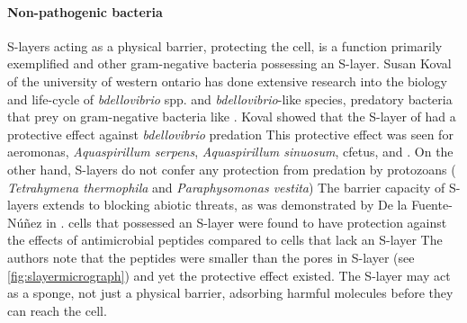 \paragraph{Non-pathogenic bacteria}  %
\acp{S-layer} acting as a physical barrier, protecting the cell, is a function primarily exemplified \caulobacter and other gram-negative bacteria possessing an \ac{S-layer}. Susan Koval of the university of western ontario has done extensive research into the biology and life-cycle of \textit{bdellovibrio} spp. and \textit{bdellovibrio}-like species, predatory bacteria that prey on gram-negative bacteria like \caulobacter. Koval showed that the \ac{S-layer} of \caulobacter had a protective effect against \textit{bdellovibrio} predation This protective effect was seen for  \ac{aeromonas}, \textit{Aquaspirillum serpens}, \textit{Aquaspirillum sinuosum}, \ac{cfetus}, and \caulobacter. On the other hand, \acp{S-layer} do not confer any protection from predation by protozoans (\eg{} \textit{Tetrahymena thermophila} and \textit{Paraphysomonas vestita}) The barrier capacity of \acp{S-layer} extends to blocking abiotic threats, as was demonstrated by De la Fuente-N{\'u}{\~n}ez \etal in . \caulobacter cells that possessed an \ac{S-layer} were found to have protection against the effects of antimicrobial peptides compared to cells that lack an \ac{S-layer} The authors note that the peptides were smaller than the pores in \caulobacter \ac{S-layer} (see \cref{fig:slayermicrograph}) and yet the protective effect existed. The \ac{S-layer} may act as a sponge, not just a physical barrier, adsorbing harmful molecules before they can reach the cell. 

